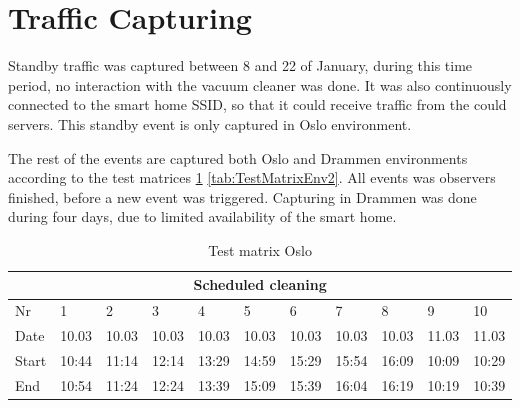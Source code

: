 \section{Traffic Capturing}
Standby traffic was captured between 8 and 22  of January, during this time period, no interaction with the vacuum cleaner was done. It was also continuously connected to the smart home SSID, so that it could receive traffic from the could servers. This standby event is only captured in Oslo environment.

The rest of the events are captured both Oslo and Drammen environments according to the test matrices \ref{tab:TestMatrixEnv1} \ref{tab:TestMatrixEnv2}. All events was observers finished, before a new event was triggered. Capturing in Drammen was done during four days, due to limited availability of the smart home.  
\begin{table}[H]
\centering
\small
\caption{Test matrix Oslo}
\label{tab:TestMatrixEnv1}
\begin{tabular}{|lllllllllll|}
\hline
\multicolumn{11}{|c|}{\textbf{Scheduled cleaning}}                                                                                                                                                                                                                                                        \\ \hline
\multicolumn{1}{|l|}{Nr} & \multicolumn{1}{l|}{1}     & \multicolumn{1}{l|}{2}     & \multicolumn{1}{l|}{3}     & \multicolumn{1}{l|}{4}     & \multicolumn{1}{l|}{5}     & \multicolumn{1}{l|}{6}     & \multicolumn{1}{l|}{7}     & \multicolumn{1}{l|}{8}     & \multicolumn{1}{l|}{9}     & 10    \\ \hline
\multicolumn{1}{|l|}{Date}   & \multicolumn{1}{l|}{10.03} & \multicolumn{1}{l|}{10.03} & \multicolumn{1}{l|}{10.03} & \multicolumn{1}{l|}{10.03} & \multicolumn{1}{l|}{10.03} & \multicolumn{1}{l|}{10.03} & \multicolumn{1}{l|}{10.03} & \multicolumn{1}{l|}{10.03} & \multicolumn{1}{l|}{11.03} & 11.03 \\ \hline
\multicolumn{1}{|l|}{Start}  & \multicolumn{1}{l|}{10:44} & \multicolumn{1}{l|}{11:14} & \multicolumn{1}{l|}{12:14} & \multicolumn{1}{l|}{13:29} & \multicolumn{1}{l|}{14:59} & \multicolumn{1}{l|}{15:29} & \multicolumn{1}{l|}{15:54} & \multicolumn{1}{l|}{16:09} & \multicolumn{1}{l|}{10:09} & 10:29 \\ \hline
\multicolumn{1}{|l|}{End}    & \multicolumn{1}{l|}{10:54} & \multicolumn{1}{l|}{11:24} & \multicolumn{1}{l|}{12:24} & \multicolumn{1}{l|}{13:39} & \multicolumn{1}{l|}{15:09} & \multicolumn{1}{l|}{15:39} & \multicolumn{1}{l|}{16:04} & \multicolumn{1}{l|}{16:19} & \multicolumn{1}{l|}{10:19} & 10:39 \\ \hline

\end{tabular}
\end{table}
